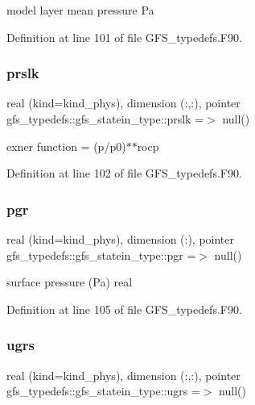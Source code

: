 model layer mean pressure Pa 



Definition at line 101 of file G\+F\+S\+\_\+typedefs.\+F90.

\mbox{\label{structgfs__typedefs_1_1gfs__statein__type_a61b67686362d8e9b01a5433f8e20a3b7}} 
\subsubsection{prslk}
{\footnotesize\ttfamily real (kind=kind\+\_\+phys), dimension (\+:,\+:), pointer gfs\+\_\+typedefs\+::gfs\+\_\+statein\+\_\+type\+::prslk =$>$ null()}



exner function = (p/p0)$\ast$$\ast$rocp 



Definition at line 102 of file G\+F\+S\+\_\+typedefs.\+F90.

\mbox{\label{structgfs__typedefs_1_1gfs__statein__type_a4e7021eac304d5f27d1dae5683b43ed7}} 
\subsubsection{pgr}
{\footnotesize\ttfamily real (kind=kind\+\_\+phys), dimension  (\+:), pointer gfs\+\_\+typedefs\+::gfs\+\_\+statein\+\_\+type\+::pgr =$>$ null()}



surface pressure (Pa) real 



Definition at line 105 of file G\+F\+S\+\_\+typedefs.\+F90.

\mbox{\label{structgfs__typedefs_1_1gfs__statein__type_a561ab902760c01590225ce0b18be1889}} 
\subsubsection{ugrs}
{\footnotesize\ttfamily real (kind=kind\+\_\+phys), dimension (\+:,\+:), pointer gfs\+\_\+typedefs\+::gfs\+\_\+statein\+\_\+type\+::ugrs =$>$ null()}



